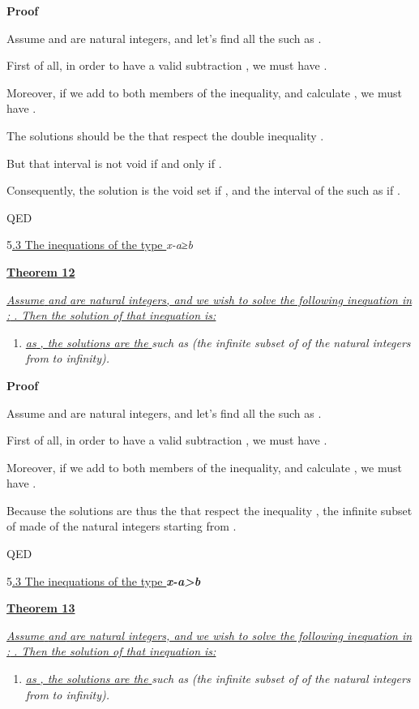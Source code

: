 \documentclass{article}
\providecommand{\tightlist}{%
  \setlength{\itemsep}{0pt}\setlength{\parskip}{0pt}}
\begin{document}
\textbf{Proof}

Assume  and  are natural integers, and let’s find all the  such as .

First of all, in order to have a valid subtraction , we must have .

Moreover, if we add  to both members of the inequality, and calculate , we must have .

The solutions should be the  that respect the double inequality .

But that interval is not void if and only if .

Consequently, the solution is the void set if , and the interval of the  such as  if .

QED

5\ul{.3 The inequations of the type }\emph{x-a}\emph{≥}\emph{b}

\ul{\textbf{Theorem 12}}

\ul{\emph{Assume }}\ul{\emph{ and }}\ul{\emph{ are natural integers, and we wish to solve the following inequation in }}\ul{\emph{: }}\ul{\emph{. Then the solution of that inequation is:}}

\begin{enumerate}
\tightlist
\item \ul{\emph{as }}\ul{\emph{, the solutions are the }}\emph{ such as }\emph{ (the infinite subset of }\emph{ of the natural integers from }\emph{ to infinity).}
\end{enumerate}

\textbf{Proof}

Assume  and  are natural integers, and let’s find all the  such as .

First of all, in order to have a valid subtraction , we must have .

Moreover, if we add  to both members of the inequality, and calculate , we must have .

Because  the solutions are thus the  that respect the inequality , the infinite subset of  made of the natural integers starting from .

QED

5\ul{.3 The inequations of the type }\emph{\textbf{x-a>b}}

\ul{\textbf{Theorem 13}}

\ul{\emph{Assume }}\ul{\emph{ and }}\ul{\emph{ are natural integers, and we wish to solve the following inequation in }}\ul{\emph{: }}\ul{\emph{. Then the solution of that inequation is:}}

\begin{enumerate}
\tightlist
\item \ul{\emph{as }}\ul{\emph{, the solutions are the }}\emph{ such as }\emph{ (the infinite subset of }\emph{ of the natural integers from }\emph{ to infinity).}
\end{enumerate}
\end{document}
